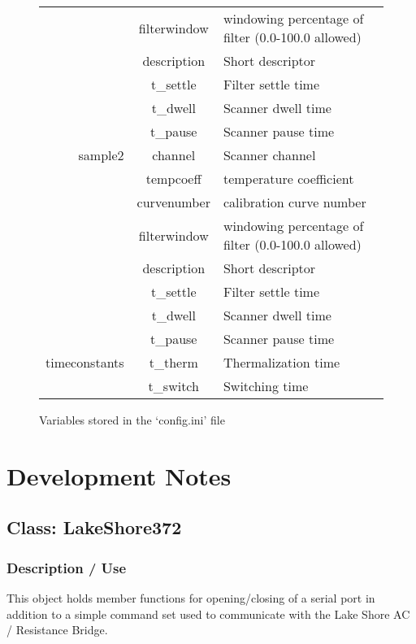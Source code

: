 \documentclass{article}
\begin{document}
\begin{figure}[H]
\begin{tabular}{ | r | c | l  |}
		      & filterwindow & windowing percentage of filter (0.0-100.0 allowed) \\
		      & description & Short descriptor \\
		      & t\_settle & Filter settle time\\
			& t\_dwell & Scanner dwell time\\
			& t\_pause & Scanner pause time \\ \hline
sample2	      & channel & Scanner channel\\
		      & tempcoeff & temperature coefficient\\	    
		      & curvenumber & calibration curve number \\  
		      & filterwindow & windowing percentage of filter (0.0-100.0 allowed) \\
		      & description & Short descriptor \\
		      & t\_settle & Filter settle time\\
			& t\_dwell & Scanner dwell time\\
			& t\_pause & Scanner pause time \\ \hline
timeconstants & t\_therm & Thermalization time\\
			& t\_switch & Switching time\\ \hline
\end{tabular}
\caption{Variables stored in the `config.ini' file}
\end{figure}

\section{Development Notes}
\subsection{Class: LakeShore372}
\subsubsection{Description / Use}
This object holds member functions for opening/closing of a serial port in addition to a simple command set used to communicate with the Lake Shore AC / Resistance Bridge.
\end{document}
